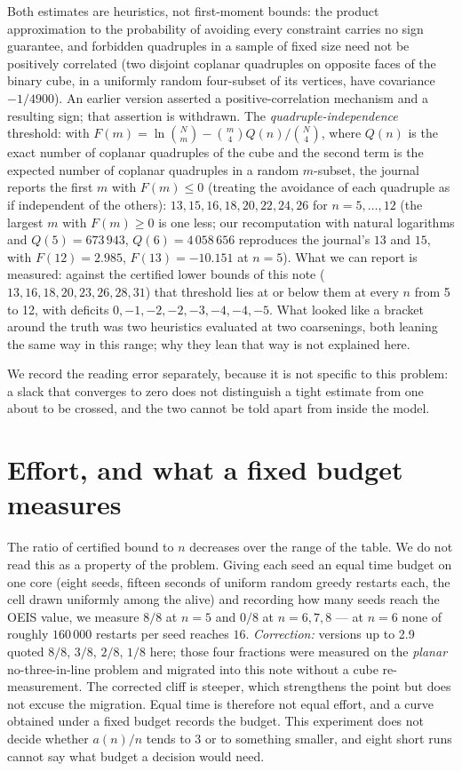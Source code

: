 \documentclass[11pt,a4paper]{article}
\begin{document}
Both estimates are heuristics, not first-moment bounds: the product approximation to the probability
of avoiding every constraint carries no sign guarantee, and forbidden quadruples in a sample of fixed
size need not be positively correlated (two disjoint coplanar quadruples on opposite faces of the
binary cube, in a uniformly random four-subset of its vertices, have covariance $-1/4900$).  An earlier
version asserted a positive-correlation mechanism and a resulting sign; that assertion is withdrawn.
The \emph{quadruple-independence} threshold: with $F(m)=\ln\binom{N}{m}-\binom{m}{4}Q(n)/\binom{N}{4}$, where
$Q(n)$ is the exact number of coplanar quadruples of the cube and the second term is the expected number of
coplanar quadruples in a random $m$-subset, the journal reports the first $m$ with $F(m)\le0$ (treating the
avoidance of each quadruple as if independent of the others): $13,15,16,18,20,22,24,26$ for $n=5,\dots,12$ (the
largest $m$ with $F(m)\ge0$ is one less; our recomputation with natural logarithms and $Q(5)=673\,943$, $Q(6)=4\,058\,656$
reproduces the journal's $13$ and $15$, with $F(12)=2.985$, $F(13)=-10.151$ at $n=5$).  What we can
report is measured: against the certified lower bounds of this note ($13,16,18,20,23,26,28,31$) that threshold
lies at or below them at every $n$ from 5 to 12, with deficits $0,-1,-2,-2,-3,-4,-4,-5$.  What looked like a bracket around the truth was two heuristics
evaluated at two coarsenings, both leaning the same way in this range; why they lean that way is not
explained here.

We record the reading error separately, because it is not specific to this problem: a slack that
converges to zero does not distinguish a tight estimate from one about to be crossed, and the two
cannot be told apart from inside the model.

\section{Effort, and what a fixed budget measures}\label{s:effort}
The ratio of certified bound to $n$ decreases over the range of the table.  We do not read this
as a property of the problem.  Giving each seed an equal time budget on one core (eight seeds, fifteen seconds of uniform random
greedy restarts each, the cell drawn uniformly among the alive) and recording how many seeds reach
the OEIS value, we measure $8/8$ at $n=5$ and $0/8$ at $n=6,7,8$ --- at $n=6$ none of roughly
$160\,000$ restarts per seed reaches $16$.  \emph{Correction:} versions up to 2.9 quoted
$8/8$, $3/8$, $2/8$, $1/8$ here; those four fractions were measured on the \emph{planar}
no-three-in-line problem and migrated into this note without a cube re-measurement.  The corrected
cliff is steeper, which strengthens the point but does not excuse the migration.
Equal time is therefore not equal effort, and a curve obtained under a fixed budget records the
budget.  This experiment does not decide whether $a(n)/n$ tends to $3$ or to something smaller,
and eight short runs cannot say what budget a decision would need.
\end{document}
